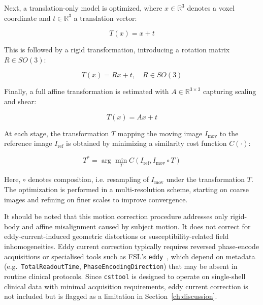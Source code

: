 Next, a translation-only model is optimized, where $x \in \mathbb{R}^3$ denotes a voxel coordinate and $t \in \mathbb{R}^3$ a translation vector:

\begin{equation}
	T(x) = x + t
\end{equation}
\label{eq:motioncorrection_translation}

This is followed by a rigid transformation, introducing a rotation matrix $R \in SO(3)$:

\begin{equation}
	T(x) = R x + t, \quad R \in SO(3)
\end{equation}
\label{eq:motioncorrection_rigid}

Finally, a full affine transformation is estimated with $A \in \mathbb{R}^{3 \times 3}$ capturing scaling and shear:

\begin{equation}
	T(x) = A x + t
\end{equation}
\label{eq:motioncorrection_affine}

At each stage, the transformation $T$ mapping the moving image $I_{\text{mov}}$ to the reference image $I_{\text{ref}}$ is obtained by minimizing a similarity cost function $C(\cdot)$:

\begin{equation}
	T^* = \arg\min_T C(I_{\text{ref}}, I_{\text{mov}} \circ T)
\end{equation}
\label{eq:motioncorrection_cost}

Here, $\circ$ denotes composition, i.e. resampling of $I_{\text{mov}}$ under the transformation $T$. The optimization is performed in a multi-resolution scheme, starting on coarse images and refining on finer scales to improve convergence.

It should be noted that this motion correction procedure addresses only rigid-body and affine misalignment caused by subject motion. It does not correct for eddy-current-induced geometric distortions or susceptibility-related field inhomogeneities. Eddy current correction typically requires reversed phase-encode acquisitions or specialised tools such as FSL's \texttt{eddy}~\cite{andersson2016integrated}, which depend on metadata (e.g.\ \texttt{TotalReadoutTime}, \texttt{PhaseEncodingDirection}) that may be absent in routine clinical protocols. Since \texttt{csttool} is designed to operate on single-shell clinical data with minimal acquisition requirements, eddy current correction is not included but is flagged as a limitation in Section~\ref{ch:discussion}.

